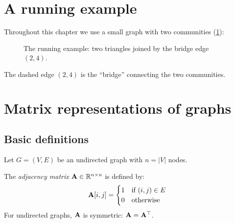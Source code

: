 \begin{notechapter}
\section{A running example}\label{graph-laplacians:sec:running}



Throughout this chapter we use a small graph with two communities (\cref{graph-laplacians:fig:running}):

\begin{figure}[ht]
\centering
{}
\caption{The running example: two triangles joined by the bridge edge $(2, 4)$.}
\label{graph-laplacians:fig:running}
\end{figure}

The dashed edge $(2,4)$ is the ``bridge'' connecting the two communities.

\section{Matrix representations of graphs}

\subsection{Basic definitions}

Let $G = (V, E)$ be an undirected graph with $n = |V|$ nodes.

\begin{definition}\label{graph-laplacians:def:adjacency}
The \emph{adjacency matrix} $\mathbf{A} \in \mathbb{R}^{n \times n}$ is defined by:
\[
\mathbf{A}[i,j] = \begin{cases} 1 & \text{if } (i,j) \in E \\ 0 & \text{otherwise} \end{cases}
\]
For undirected graphs, $\mathbf{A}$ is symmetric: $\mathbf{A} = \mathbf{A}^\top$.
\end{definition}


\end{notechapter}
